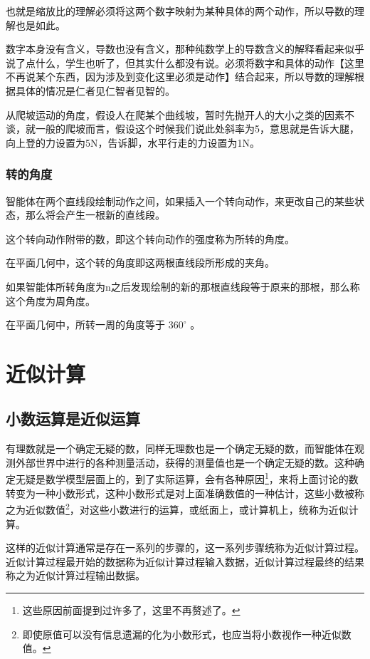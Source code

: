 \documentclass[12pt,oneside]{book}
\begin{document}
也就是缩放比的理解必须将这两个数字映射为某种具体的两个动作，所以导数的理解也是如此。

数字本身没有含义，导数也没有含义，那种纯数学上的导数含义的解释看起来似乎说了点什么，学生也听了，但其实什么都没有说。必须将数字和具体的动作【这里不再说某个东西，因为涉及到变化这里必须是动作】结合起来，所以导数的理解根据具体的情况是仁者见仁智者见智的。

从爬坡运动的角度，假设人在爬某个曲线坡，暂时先抛开人的大小之类的因素不谈，就一般的爬坡而言，假设这个时候我们说此处斜率为5，意思就是告诉大腿，向上登的力设置为5N，告诉脚，水平行走的力设置为1N。



\subsection{转的角度}
智能体在两个直线段绘制动作之间，如果插入一个转向动作，来更改自己的某些状态，那么将会产生一根新的直线段。

这个转向动作附带的数，即这个转向动作的强度称为所转的角度。

在平面几何中，这个转的角度即这两根直线段所形成的夹角。

如果智能体所转角度为n之后发现绘制的新的那根直线段等于原来的那根，那么称这个角度为周角度。

在平面几何中，所转一周的角度等于 $360^{\circ}$ 。





\chapter{近似计算}
\section{小数运算是近似运算}
有理数就是一个确定无疑的数，同样无理数也是一个确定无疑的数，而智能体在观测外部世界中进行的各种测量活动，获得的测量值也是一个确定无疑的数。这种确定无疑是数学模型层面上的，到了实际运算，会有各种原因\footnote{这些原因前面提到过许多了，这里不再赘述了。}，来将上面讨论的数转变为一种小数形式，这种小数形式是对上面准确数值的一种估计，这些小数被称之为近似数值\footnote{即使原值可以没有信息遗漏的化为小数形式，也应当将小数视作一种近似数值。}，对这些小数进行的运算，或纸面上，或计算机上，统称为近似计算。

这样的近似计算通常是存在一系列的步骤的，这一系列步骤统称为近似计算过程。近似计算过程最开始的数据称为近似计算过程输入数据，近似计算过程最终的结果称之为近似计算过程输出数据。
\end{document}
